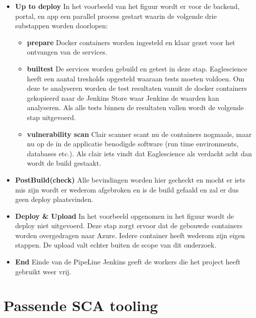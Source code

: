 \begin{itemize}
\begin{itemize}
        \item \textbf{Up to deploy}
        In het voorbeeld van het figuur wordt er voor de backend, portal, en app een parallel process gestart waarin de volgende drie substappen worden doorlopen:
        \begin{itemize}
            \item \textbf{prepare} Docker containers worden ingesteld en klaar gezet voor het ontvangen van de services.
            \item \textbf{builtest} De services worden gebuild en getest in deze stap. Eaglescience heeft een aantal tresholds opgesteld waaraan tests moeten voldoen. Om deze te analyseren worden de test resultaten vanuit de docker containers gekopieerd naar de Jenkins Store waar Jenkins de waarden kan analyseren. Als alle tests binnen de resultaten vallen wordt de volgende stap uitgevoerd.
            \item \textbf{vulnerability scan} Clair scanner scant nu de containers nogmaals, maar nu op de in de applicatie benodigde software (run time environments, databases etc.). Als clair iets vindt dat Eaglescience als verdacht acht dan wordt de build gestaakt.
        \end{itemize}
        \item \textbf{PostBuild(check)}
        Alle bevindingen worden hier gecheckt en mocht er iets mis zijn wordt er wederom afgebroken en is de build gefaald en zal er dus geen deploy plaatsvinden.
        \item \textbf{Deploy \& Upload}
        In het voorbeeld opgenomen in het figuur wordt de deploy niet uitgevoerd. Deze stap zorgt ervoor dat de gebouwde containers worden overgedragen naar Azure. Iedere container heeft wederom zijn eigen stappen. De upload valt echter buiten de scope van dit onderzoek.
        \item \textbf{End}
        Einde van de PipeLine Jenkins geeft de workers die het project heeft gebruikt weer vrij.
    \end{itemize}


    \section{Passende SCA tooling}\label{sec:sca-tooling}


\end{itemize}
